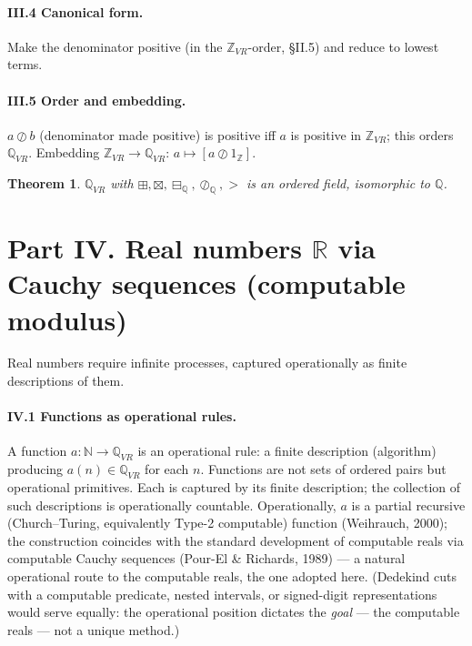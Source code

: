 \documentclass[11pt]{article}
\newtheorem{theorem}{Theorem}
\theoremstyle{definition}
\newcommand{\Z}{\mathbb{Z}}
\newcommand{\Q}{\mathbb{Q}}
\newcommand{\R}{\mathbb{R}}
\newcommand{\N}{\mathbb{N}}
\newcommand{\fdiv}{\oslash}              %
\begin{document}
\paragraph{III.4 Canonical form.} Make the denominator positive (in the $\Z_{VR}$-order, \S II.5)
and reduce to lowest terms.

\paragraph{III.5 Order and embedding.} $a\fdiv b$ (denominator made positive) is positive iff $a$ is
positive in $\Z_{VR}$; this orders $\Q_{VR}$. Embedding $\Z_{VR}\to\Q_{VR}$: $a\mapsto[a\fdiv 1_{\Z}]$.

\begin{theorem}
$\Q_{VR}$ with $\boxplus,\boxtimes,\boxminus_{\Q},\oslash_{\Q},>$ is an ordered field, isomorphic to $\Q$.
\end{theorem}

\section*{Part IV. Real numbers $\R$ via Cauchy sequences (computable modulus)}

Real numbers require infinite processes, captured operationally as finite descriptions of them.

\paragraph{IV.1 Functions as operational rules.} A function $a:\N\to\Q_{VR}$ is an operational rule:
a finite description (algorithm) producing $a(n)\in\Q_{VR}$ for each $n$. Functions are not sets of
ordered pairs but operational primitives. Each is captured by its finite description; the collection of
such descriptions is operationally countable. Operationally, $a$ is a partial recursive (Church--Turing,
equivalently Type-2 computable) function (Weihrauch, 2000); the construction coincides with the
standard development of computable reals via computable Cauchy sequences (Pour-El \& Richards,
1989) --- a natural operational route to the computable reals, the one adopted here. (Dedekind cuts
with a computable predicate, nested intervals, or signed-digit representations would serve equally:
the operational position dictates the \emph{goal} --- the computable reals --- not a unique method.)
\end{document}
